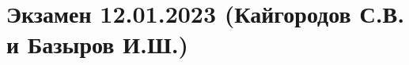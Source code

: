 \documentclass[main.tex]{subfiles}
\begin{document}

\renewcommand{\thesubsection}{\arabic{subsection}}

\section*{Экзамен 12.01.2023 (Кайгородов С.В. и Базыров И.Ш.)}


\newpage


\newpage


\newpage


\newpage


\newpage


\newpage


\newpage


\newpage


\newpage


\newpage


\newpage


\newpage


\newpage


\newpage


\newpage


\newpage


\newpage


\newpage


\newpage


\newpage


\newpage


\newpage


\newpage


\newpage


\newpage


\newpage


\newpage
\end{document}
